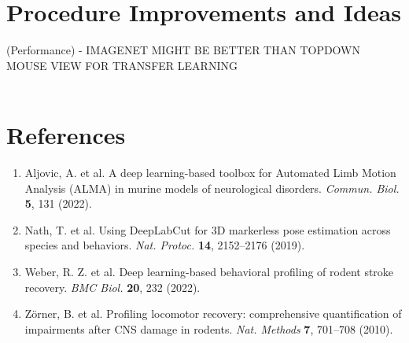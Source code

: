 \documentclass[11pt]{article}
\renewcommand{\[}{%
  \par\smallskip\noindent
  \begin{center}%
  \setlength{\fboxsep}{5pt}%
  \setlength{\fboxrule}{0.35pt}%
  \begin{lrbox}{\almaEquationBox}%
  $\displaystyle
}
\renewcommand{\]}{%
  $%
  \end{lrbox}%
  \fcolorbox{equationLine}{equationBack}{\usebox{\almaEquationBox}}%
  \end{center}%
  \smallskip\par
}
\begin{document}
\section{Procedure Improvements and Ideas}

(Performance)
- IMAGENET MIGHT BE BETTER THAN TOPDOWN MOUSE VIEW FOR TRANSFER LEARNING \\
\\


\section{References}
\begin{enumerate}
    \item Aljovic, A. et al. A deep learning-based toolbox for Automated Limb Motion Analysis (ALMA) in murine models of neurological disorders. \textit{Commun. Biol.} \textbf{5}, 131 (2022).

    \item Nath, T. et al. Using DeepLabCut for 3D markerless pose estimation across species and behaviors. \textit{Nat. Protoc.} \textbf{14}, 2152--2176 (2019).

    \item Weber, R. Z. et al. Deep learning-based behavioral profiling of rodent stroke recovery. \textit{BMC Biol.} \textbf{20}, 232 (2022).

    \item Zörner, B. et al. Profiling locomotor recovery: comprehensive quantification of impairments after CNS damage in rodents. \textit{Nat. Methods} \textbf{7}, 701--708 (2010).
\end{enumerate}
\end{document}
